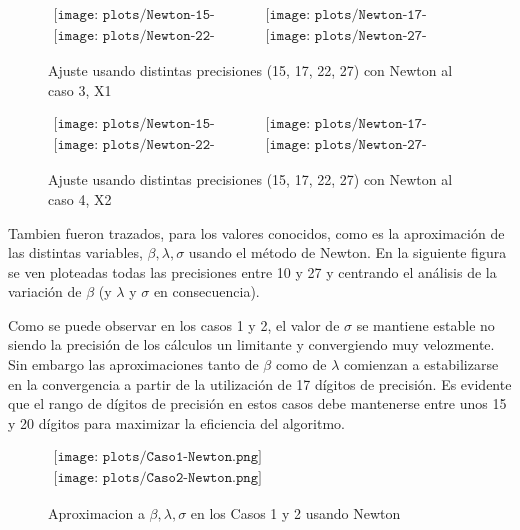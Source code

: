 \begin{figure} [H]
$\begin{array}{cc}
\texttt{[image: plots/Newton-15-caso3.png]} &
\texttt{[image: plots/Newton-17-caso3.png]} \\
\texttt{[image: plots/Newton-22-caso3.png]} &
\texttt{[image: plots/Newton-27-caso3.png]}
\end{array}$
\caption{Ajuste usando distintas precisiones (15, 17, 22, 27) con Newton al caso 3, X1}
\label{fig:FitCaso3Newton}
\end{figure}

\begin{figure} [H]
$\begin{array}{cc}
\texttt{[image: plots/Newton-15-caso4.png]} &
\texttt{[image: plots/Newton-17-caso4.png]} \\
\texttt{[image: plots/Newton-22-caso4.png]} &
\texttt{[image: plots/Newton-27-caso4.png]}
\end{array}$
\caption{Ajuste usando distintas precisiones (15, 17, 22, 27) con Newton al caso 4, X2}
\label{fig:FitCaso4Newton}
\end{figure}


Tambien fueron trazados, para los valores conocidos, como es la 
aproximaci\'on de las distintas variables, $\beta, \lambda, \sigma$ usando el 
m\'etodo de Newton. En la siguiente figura se ven ploteadas todas las 
precisiones entre 10 y 27 y centrando el an\'alisis de la variaci\'on de 
$\beta$ (y $\lambda$ y $\sigma$ en consecuencia).

Como se puede observar en los casos 1 y 2, el valor de $\sigma$ se mantiene estable no siendo la precisi\'on de los c\'alculos un limitante y convergiendo muy velozmente. Sin embargo las aproximaciones tanto de $\beta$ como de $\lambda$ comienzan a estabilizarse en la convergencia a partir de la utilizaci\'on de 17 d\'igitos de precisi\'on. Es evidente que el rango de d\'igitos de precisi\'on en estos casos debe mantenerse entre unos 15 y 20 d\'igitos para maximizar la eficiencia del algoritmo.  

\begin{figure}
$\begin{array}{c}
\texttt{[image: plots/Caso1-Newton.png]} \\
\texttt{[image: plots/Caso2-Newton.png]}
\end{array}$

\caption{Aproximacion a $\beta, \lambda, \sigma$ en los Casos 1 y 2 usando Newton}
\end{figure}

